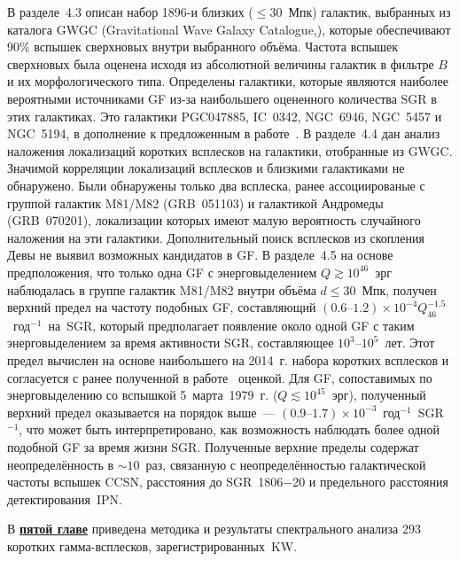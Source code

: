 В разделе~4.3 описан набор 1896-и близких ($\le 30$~Мпк) галактик, 
выбранных из каталога GWGC (Gravitational Wave Galaxy Catalogue,\citep{White2011CQGra}),
которые обеспечивают 90\% вспышек сверхновых внутри выбранного объёма.
Частота вспышек сверхновых была оценена исходя из абсолютной величины галактик 
в фильтре $B$ и их морфологического типа. 
Определены галактики, которые являются наиболее вероятными источниками GF 
из-за наибольшего оцененного количества SGR в этих галактиках. Это галактики
PGC047885, IC~0342, NGC~6946, NGC~5457 и NGC~5194, в дополнение к предложенным 
в работе~\citep{Popov2006}.
В разделе~4.4 дан анализ наложения 
локализаций коротких всплесков на галактики, отобранные из GWGC. Значимой 
корреляции локализаций всплесков и близкими галактиками не обнаружено. 
Были обнаружены только два всплеска, ранее ассоциированые 
с группой галактик M81/M82 (GRB~051103) и галактикой Андромеды (GRB~070201),
локализации которых имеют малую вероятность случайного наложения на эти галактики.
Дополнительный поиск всплесков из скопления Девы не выявил возможных кандидатов в GF.
В разделе~4.5 на основе предположения, что только одна GF с энерговыделением 
$Q \gtrsim 10^{46}$~эрг наблюдалась в группе галактик M81/M82 внутри объёма $d \le 30$~Мпк, 
получен верхний предел на частоту подобных GF, составляющий 
${(0.6\textrm{--}1.2)\times 10^{-4} Q_{46}^{-1.5}}$~год$^{-1}$~на~SGR, который предполагает 
появление около одной GF с таким энерговыделением за время активности SGR, 
составляющее $10^3\textrm{--}10^5$~лет. 
Этот предел вычислен на основе наибольшего на 2014~г.  
набора коротких всплесков и согласуется с ранее полученной в работе~\citep{Ofek_2007ApJ} оценкой. 
Для GF, сопоставимых по энерговыделению со вспышкой 5~марта~1979~г. ($Q \lesssim 10^{45}$~эрг), 
полученный верхний предел оказывается на порядок выше~--- $(0.9\textrm{--}1.7)\times 10^{-3}$~год$^{-1}$~SGR$^{-1}$,  
что может быть интерпретировано, как возможность наблюдать более одной подобной GF за время жизни SGR.
Полученные верхние пределы содержат неопределённость в $\sim 10$~раз, связанную с
неопределённостью галактической частоты вспышек CCSN, расстояния до SGR~1806$-$20 и
предельного расстояния детектирования~IPN.

В \underline{\textbf{пятой главе}} приведена методика и результаты спектрального 
анализа 293 коротких гамма-всплесков, зарегистрированных~KW.

